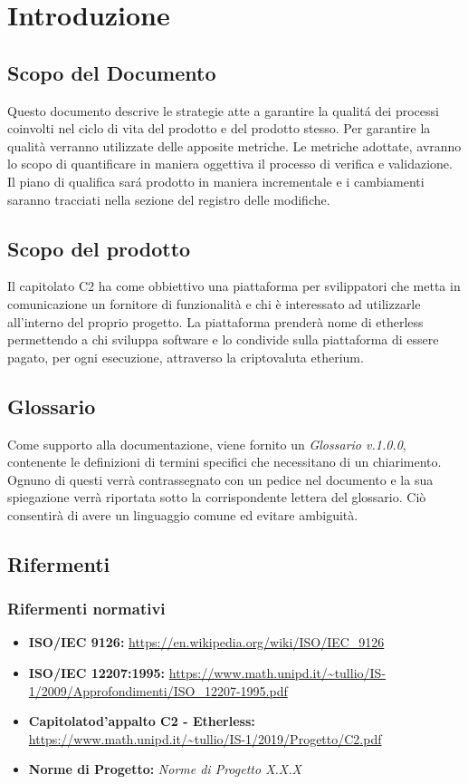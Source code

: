 \section{Introduzione}

\subsection{Scopo del Documento}
Questo documento descrive le strategie atte a garantire la qualit\'a dei processi coinvolti nel ciclo di vita del prodotto e del prodotto stesso. Per garantire la qualità verranno utilizzate delle apposite metriche. Le metriche adottate, avranno lo scopo di quantificare in maniera oggettiva il processo di verifica e validazione. Il piano di qualifica sar\'a prodotto in maniera incrementale e i cambiamenti saranno tracciati nella sezione del registro delle modifiche.

\subsection{Scopo del prodotto}
Il capitolato C2 ha come obbiettivo una piattaforma per svilippatori che metta
in comunicazione un fornitore di funzionalit\`a e chi \`e interessato ad utilizzarle
all'interno del proprio progetto.
La piattaforma prender\`a nome di etherless permettendo a chi sviluppa software e
lo condivide sulla piattaforma di essere pagato, per ogni esecuzione, attraverso
la criptovaluta etherium.


\subsection{Glossario}
Come supporto alla documentazione, viene fornito un \textit{Glossario v.1.0.0},
contenente le definizioni di termini specifici che necessitano di un chiarimento.
Ognuno di questi verr\`a contrassegnato con un pedice \glo nel documento e la sua
spiegazione verr\`a riportata sotto la corrispondente lettera del glossario. Ci\`o
consentir\`a di avere un linguaggio comune ed evitare ambiguit\`a.

\subsection{Rifermenti}
\subsubsection{Rifermenti normativi}
\begin{itemize}
	  \item \textbf{ISO/IEC 9126:} \url{https://en.wikipedia.org/wiki/ISO/IEC_9126}
	  \item \textbf{ISO/IEC 12207:1995:}  \url{https://www.math.unipd.it/~tullio/IS-1/2009/Approfondimenti/ISO_12207-1995.pdf}
  	  \item \textbf{Capitolato\glo d'appalto C2 - Etherless:} \url{https://www.math.unipd.it/~tullio/IS-1/2019/Progetto/C2.pdf}
  	  \item \textbf{Norme di Progetto:} \textit{Norme di Progetto X.X.X}
\end{itemize}
